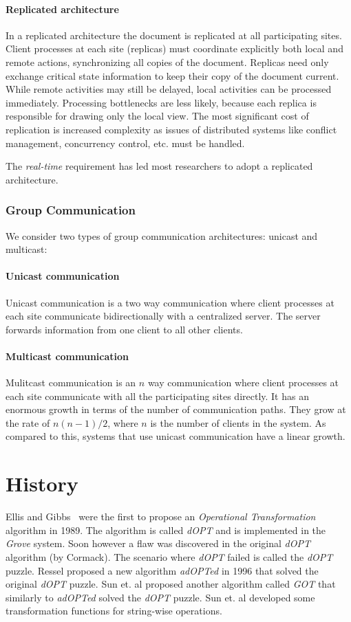 \documentclass[11pt,a4paper]{article}
\begin{document}
\paragraph{Replicated architecture} In a replicated architecture the document is replicated at all participating sites. Client processes at each site (replicas) must coordinate explicitly both local and remote actions, synchronizing all copies of the document. Replicas need only exchange critical state information to keep their copy of the document current. While remote activities may still be delayed, local activities can be processed immediately. Processing bottlenecks are less likely, because each replica is responsible for drawing only the local view. The most significant cost of replication is increased complexity as issues of distributed systems like conflict management, concurrency control, etc. must be handled. 

The \emph{real-time} requirement has led most researchers to adopt a replicated architecture.


\subsubsection{Group Communication}
We consider two types of group communication architectures: unicast and multicast:

\paragraph{Unicast communication} Unicast communication is a two way communication where client processes at each site communicate bidirectionally with a centralized server. The server forwards information from one client to all other clients.

\paragraph{Multicast communication} Mulitcast communication is an $n$ way communication where client processes at each site communicate with all the participating sites directly. It has an enormous growth in terms of the number of communication paths. They grow at the rate of $n(n-1)/2$, where $n$ is the number of clients in the system. As compared to this, systems that use unicast communication have a linear growth. 


\section{History}
{Ellis and Gibbs}~\cite{ellis} were the first to propose an \emph{Operational Transformation} algorithm in 1989. The algorithm is called \emph{dOPT} and is implemented in the \emph{Grove} system. Soon however a flaw was discovered in the original \emph{dOPT} algorithm (by Cormack\cite{cormack95a}). The scenario where \emph{dOPT} failed is called the \emph{dOPT} puzzle. Ressel\cite{ressel96} proposed a new algorithm \emph{adOPTed} in 1996 that solved the original \emph{dOPT} puzzle. {Sun et. al}\cite{sun98a} proposed another algorithm called \emph{GOT} that similarly to \emph{adOPTed} solved the \emph{dOPT} puzzle. {Sun et. al}\cite{sun98b} developed some transformation functions for string-wise operations.
\end{document}
